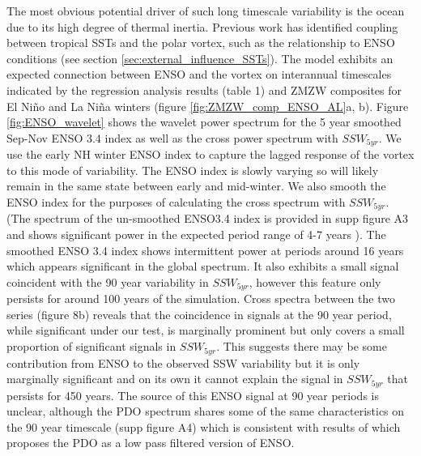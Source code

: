 The most obvious potential driver of such long timescale variability is the ocean due to its high degree of thermal inertia. Previous work has identified coupling between tropical SSTs and the polar vortex, such as the relationship to ENSO conditions (see section \ref{sec:external_influence_SSTs}). The model exhibits an expected connection between ENSO and the vortex on interannual timescales indicated by the regression analysis results (table 1) and ZMZW composites for El Ni\~{n}o and La Ni\~{n}a winters (figure \ref{fig:ZMZW_comp_ENSO_AL}a, b). Figure \ref{fig:ENSO_wavelet} shows the wavelet power spectrum for the 5 year smoothed Sep-Nov ENSO 3.4 index as well as the cross power spectrum with $SSW_{5yr}$. We use the early NH winter ENSO index to capture the lagged response of the vortex to this mode of variability. The ENSO index is slowly varying so will likely remain in the same state between early and mid-winter. We also smooth the ENSO index for the purposes of calculating the cross spectrum with $SSW_{5yr}$. (The spectrum of the un-smoothed ENSO3.4 index is provided in supp figure A3 and shows significant power in the expected period range of 4-7 years \citep{Santoso2017}). The smoothed ENSO 3.4 index shows intermittent power at periods around 16 years which appears significant in the global spectrum. It also exhibits a small signal coincident with the 90 year variability in $SSW_{5yr}$, however this feature only persists for around 100 years of the simulation. Cross spectra between the two series (figure 8b) reveals that the coincidence in signals at the 90 year period, while significant under our test, is marginally prominent but only covers a small proportion of significant signals in $SSW_{5yr}$. This suggests there may be some contribution from ENSO to the observed SSW variability but it is only marginally significant and on its own it cannot explain the signal in $SSW_{5yr}$ that persists for 450 years. The source of this ENSO signal at 90 year periods is unclear, although the PDO spectrum shares some of the same characteristics on the 90 year timescale (supp figure A4) which is consistent with results of \cite{Newman2016} which proposes the PDO as a low pass filtered version of ENSO. 

